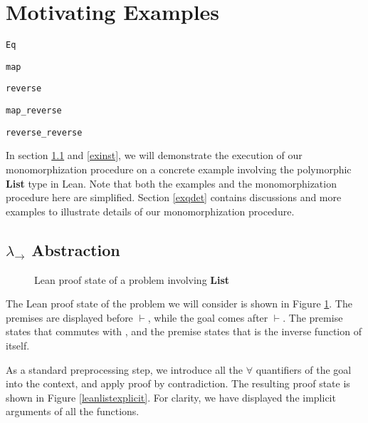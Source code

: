 \section{Motivating Examples} \label{motex}

\begin{lrbox}{\vEq} {\color{hypcolor} \verb|Eq|} \end{lrbox}
\begin{lrbox}{\vmap} {\color{hypcolor} \verb|map|} \end{lrbox}
\begin{lrbox}{\vrev} {\color{hypcolor} \verb|reverse|} \end{lrbox}
\begin{lrbox}{\vmaprev} {\color{hypcolor} \verb|map_reverse|} \end{lrbox}
\begin{lrbox}{\vrevrev} {\color{hypcolor} \verb|reverse_reverse|} \end{lrbox}

In section \ref{exabst} and \ref{exinst}, we will demonstrate the execution of our monomorphization procedure on a
concrete example involving the polymorphic \textbf{List} type in Lean. Note that both
the examples and the monomorphization procedure here are simplified. Section \ref{exqdet} contains
discussions and more examples to illustrate details of our monomorphization procedure.

\subsection{$\lambda_\to$ Abstraction} \label{exabst}

\begin{figure}
  \begin{CenteredBox}
    
  \end{CenteredBox}
  \caption{Lean proof state of a problem involving \textbf{List}} \label{leanlistpretty}
\end{figure}

\noindent The Lean proof state of the problem we will consider is shown in Figure \ref{leanlistpretty}.
The premises are displayed before $\vdash$, while the goal comes after $\vdash$. The premise
\usebox{\vmaprev} states that \usebox{\vmap} commutes with \usebox{\vrev}, and the premise
\usebox{\vrevrev} states that \usebox{\vrev} is the inverse function of itself.

\noindent As a standard preprocessing step, we introduce all the $\forall$ quantifiers
of the goal into the context, and apply proof by contradiction. The resulting proof state
is shown in Figure \ref{leanlistexplicit}.
For clarity, we have displayed the implicit arguments of all the functions.

